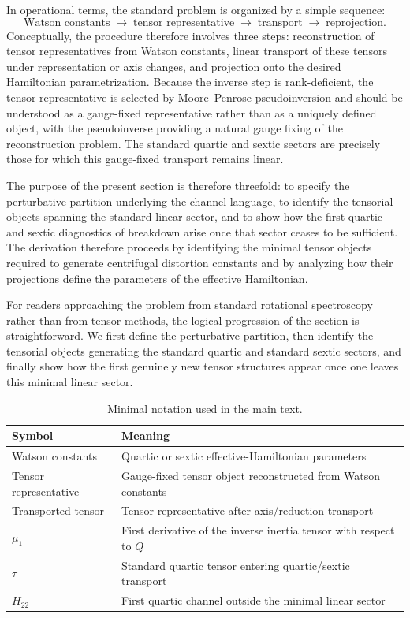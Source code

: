 In operational terms, the standard problem is organized by a simple
sequence:
\begin{equation}
\text{Watson constants}
\;\longrightarrow\;
\text{tensor representative}
\;\longrightarrow\;
\text{transport}
\;\longrightarrow\;
\text{reprojection}.
\end{equation}
Conceptually, the procedure therefore involves three steps:
reconstruction of tensor representatives from Watson constants, linear
transport of these tensors under representation or axis changes, and
projection onto the desired Hamiltonian parametrization.
Because the inverse step is rank-deficient, the tensor representative
is selected by Moore--Penrose pseudoinversion and should be understood
as a gauge-fixed representative rather than as a uniquely defined
object, with the pseudoinverse providing a natural gauge fixing of the
reconstruction problem.\cite{Penrose1955} The standard quartic and sextic sectors are precisely those for
which this gauge-fixed transport remains linear.

The purpose of the present section is therefore threefold: to specify
the perturbative partition underlying the channel language, to identify
the tensorial objects spanning the standard linear sector, and to show
how the first quartic and sextic diagnostics of breakdown arise once
that sector ceases to be sufficient.
The derivation therefore proceeds by identifying the minimal tensor
objects required to generate centrifugal distortion constants and by
analyzing how their projections define the parameters of the effective
Hamiltonian.

For readers approaching the problem from standard rotational
spectroscopy rather than from tensor methods, the logical progression
of the section is straightforward. We first define the perturbative
partition, then identify the tensorial objects generating the standard
quartic and standard sextic sectors, and finally show how the first
genuinely new tensor structures appear once one leaves this minimal
linear sector.

\begin{table}[h]
\centering
\caption{Minimal notation used in the main text.}
\begin{tabular}{ll}
\hline
Symbol & Meaning \\
\hline
Watson constants & Quartic or sextic effective-Hamiltonian parameters \\
Tensor representative & Gauge-fixed tensor object reconstructed from Watson constants \\
Transported tensor & Tensor representative after axis/reduction transport \\
$\mu_1$ & First derivative of the inverse inertia tensor with respect to $Q$ \\
$\tau$ & Standard quartic tensor entering quartic/sextic transport \\
$H_{22}$ & First quartic channel outside the minimal linear sector \\
\hline
\end{tabular}
\end{table}

